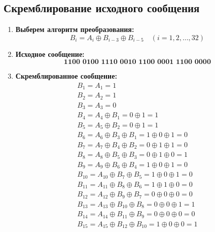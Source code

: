 \subsection{Скремблирование исходного сообщения}
\begin{enumerate}
	\item \textbf{Выберем алгоритм преобразования:}
	      \[
		      B_i = A_i \oplus B_{i-3} \oplus B_{i-5} \quad (i = 1, 2, \ldots, 32)
	      \]

	\item \textbf{Исходное сообщение:}
	      \[
		      \textbf{1100\ 0100\ 1110\ 0010\ 1100\ 0001\ 1100\ 0000}
	      \]

	\item \textbf{Скремблированное сообщение:}
	      \[
		      \begin{array}{ll}
			      B_1 = A_1 = 1                                                         \\
			      B_2 = A_2 = 1                                                         \\
			      B_3 = A_3 = 0                                                         \\
			      B_4 = A_4 \oplus B_1 = 0 \oplus 1 = 1                                 \\
			      B_5 = A_5 \oplus B_2 = 0 \oplus 1 = 1                                 \\
			      B_6 = A_6 \oplus B_3 \oplus B_1 = 1 \oplus 0 \oplus 1 = 0             \\
			      B_7 = A_7 \oplus B_4 \oplus B_2 = 0 \oplus 1 \oplus 1 = 0             \\
			      B_8 = A_8 \oplus B_5 \oplus B_3 = 0 \oplus 1 \oplus 0 = 1             \\
			      B_9 = A_9 \oplus B_6 \oplus B_4 = 1 \oplus 0 \oplus 1 = 0             \\
			      B_{10} = A_{10} \oplus B_7 \oplus B_5 = 1 \oplus 0 \oplus 1 = 0       \\
			      B_{11} = A_{11} \oplus B_8 \oplus B_6 = 1 \oplus 1 \oplus 0 = 0       \\
			      B_{12} = A_{12} \oplus B_9 \oplus B_7 = 0 \oplus 0 \oplus 0 = 0       \\
			      B_{13} = A_{13} \oplus B_{10} \oplus B_8 = 0 \oplus 0 \oplus 1 = 1    \\
			      B_{14} = A_{14} \oplus B_{11} \oplus B_9 = 0 \oplus 0 \oplus 0 = 0    \\
			      B_{15} = A_{15} \oplus B_{12} \oplus B_{10} = 1 \oplus 0 \oplus 0 = 1 \\

\end{array}\]
\end{enumerate}

